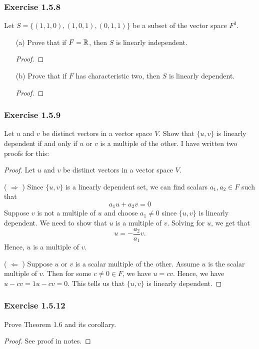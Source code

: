 \subsubsection{Exercise 1.5.8} Let \( S = \{ (1,1,0) , (1,0,1), (0,1,1) \}  \) be a subset of the vector space \( F^{3} \).
\begin{enumerate}
    \item[(a)] Prove that if \( F = \mathbb{R}  \), then \( S  \) is linearly independent.
        \begin{proof}
        
        \end{proof}
    \item[(b)] Prove that if \( F  \) has characteristic two, then \( S  \) is linearly dependent.
        \begin{proof}
        
        \end{proof}
\end{enumerate} 


\subsubsection{Exercise 1.5.9} Let \( u \) and \( v  \) be distinct vectors in a vector space \( V  \). Show that \( \{ u,v  \}  \) is linearly dependent if and only if \( u  \) or \( v  \) is a multiple of the other.
I have written two proofs for this:
\begin{proof}
Let \( u  \) and \( v  \) be distinct vectors in a vector space \( V  \). 

( \(  \Rightarrow \) ) Since \( \{ u,v  \}   \) is a linearly dependent set, we can find scalars \( a_{1} , a_{2} \in F   \) such that 
\[ a_{1} u + a_{2} v = 0 \tag{1} \] 
Suppose \( v  \) is not a multiple of \( u  \) and choose \( a_{1} \neq 0  \) since \( \{ u,v  \}   \) is linearly dependent. We need to show that \( u  \) is a multiple of \( v  \). Solving for \( u  \), we get that
\[  u =  - \frac{ a_{2} }{ a_{1} }   v. \]
Hence, \( u  \) is a multiple of \( v  \). 

( \( \Leftarrow \) ) Suppose \( u  \) or \( v  \) is a scalar multiple of the other. Assume \( u  \) is the scalar multiple of \( v  \). Then for some \( c \neq 0 \in F  \), we have \( u = cv  \).  Hence, we have \( u - cv = 1u - cv = 0  \). This tells us that \( \{ u,v  \}  \) is linearly dependent. 
\end{proof}


\subsubsection{Exercise 1.5.12} Prove Theorem 1.6 and its corollary.
\begin{proof}
See proof in notes.
\end{proof}

